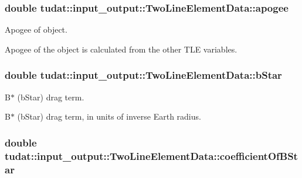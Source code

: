 \subsubsection[{\texorpdfstring{apogee}{apogee}}]{\setlength{\rightskip}{0pt plus 5cm}double tudat\+::input\+\_\+output\+::\+Two\+Line\+Element\+Data\+::apogee}\hypertarget{structtudat_1_1input__output_1_1TwoLineElementData_a9185be3843e087ee9aa9fe3af0fc6e1a}{}\label{structtudat_1_1input__output_1_1TwoLineElementData_a9185be3843e087ee9aa9fe3af0fc6e1a}


Apogee of object. 

Apogee of the object is calculated from the other T\+LE variables. 
\subsubsection[{\texorpdfstring{b\+Star}{bStar}}]{\setlength{\rightskip}{0pt plus 5cm}double tudat\+::input\+\_\+output\+::\+Two\+Line\+Element\+Data\+::b\+Star}\hypertarget{structtudat_1_1input__output_1_1TwoLineElementData_a32661a991535da8bc35b5156f068ab07}{}\label{structtudat_1_1input__output_1_1TwoLineElementData_a32661a991535da8bc35b5156f068ab07}


B$\ast$ (b\+Star) drag term. 

B$\ast$ (b\+Star) drag term, in units of inverse Earth radius. 
\subsubsection[{\texorpdfstring{coefficient\+Of\+B\+Star}{coefficientOfBStar}}]{\setlength{\rightskip}{0pt plus 5cm}double tudat\+::input\+\_\+output\+::\+Two\+Line\+Element\+Data\+::coefficient\+Of\+B\+Star}\hypertarget{structtudat_1_1input__output_1_1TwoLineElementData_a5044a9e34acd7fb159560c4d29b68b45}{}\label{structtudat_1_1input__output_1_1TwoLineElementData_a5044a9e34acd7fb159560c4d29b68b45}


